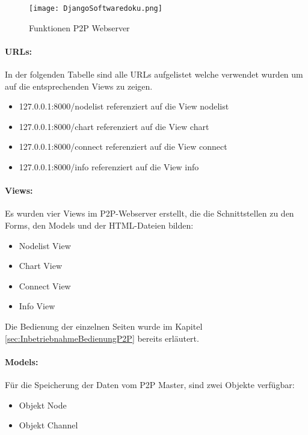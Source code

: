 \begin{figure} [H]
	\centering
	\texttt{[image: DjangoSoftwaredoku.png]}
	\caption{Funktionen P2P Webserver}
	\label{fig:FunktionenP2PWebserver}
\end{figure}


\paragraph{URLs:}\label{par:2URLs}
In der folgenden Tabelle sind alle URLs aufgelistet welche verwendet wurden um auf die entsprechenden Views zu zeigen.

\begin{itemize}
	\item 127.0.0.1:8000/node\textunderscore list \hspace{2.5mm} referenziert auf die View node\textunderscore list
	\item 127.0.0.1:8000/chart \hspace{10mm} referenziert auf die View chart
	\item 127.0.0.1:8000/connect \hspace{6mm} referenziert auf die View connect
	\item 127.0.0.1:8000/info \hspace{12.5mm} referenziert auf die View info
\end{itemize} 

\paragraph{Views:}\label{par:2Views}
Es wurden vier Views im P2P-Webserver erstellt, die die Schnittstellen zu den Forms, den Models und der HTML-Dateien bilden:
\begin{itemize}
	\item Node\textunderscore list View
	\item Chart View
	\item Connect View
	\item Info View
\end{itemize} 
Die Bedienung der einzelnen Seiten wurde im Kapitel \ref{sec:InbetriebnahmeBedienungP2P} bereits erläutert.

\paragraph{Models: }\label{par:2Models}
Für die Speicherung der Daten vom P2P Master, sind zwei Objekte verfügbar: 
\begin{itemize}
	\item Objekt Node
	\item Objekt Channel
\end{itemize} 

